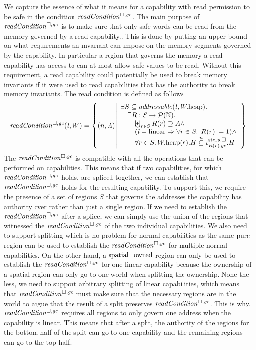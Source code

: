 \begin{jversion}
We capture the essence of what it means for a capability with read permission to be safe in the condition $\readCond{}$.
The main purpose of $\readCond{}$ is to make sure that only safe words can be read from the memory governed by a read capability..
This is done by putting an upper bound on what requirements an invariant can impose on the memory segments governed by the capability.
In particular a region that governs the memory a read capability has access to can at most allow safe values to be read.
Without this requirement, a read capability could potentially be used to break memory invariants if it were used to read capabilities that has the authority to break memory invariants.
The read condition is defined as follows
\[
  \readCond{\lin,W} = \left\{ \npair{A} \middle| 
    \begin{array}{l}
      \exists S \subseteq \addressable{\lin, \pwheap} \ldotp \\
      \quad \exists R : S \fun \powerset{\nats} \ldotp\\
      \qquad \biguplus_{r\in S} R(r) \supseteq A \wedge\\
      \qquad (\lin = \linear \Rightarrow \forall r \in S \ldotp |R(r)|  = 1) \wedge\\
      \qquad \forall r \in S \ldotp \pwheap(r).H \nsubeq \stdreg{R(r),\gc}{\pur}.H
    \end{array}
  \right\}
\]
The $\readCond{}$ is compatible with all the operations that can be performed on capabilities.
This means that if two capabilities, for which $\readCond{}$ holds, are spliced together, we can establish that $\readCond{}$ holds for the resulting capability.
To support this, we require the presence of a set of regions $S$ that governs the addresses the capability has authority over rather than just a single region.
If we need to establish the $\readCond{}$ after a splice, we can simply use the union of the regions that witnessed the $\readCond{}$ of the two individual capabilities.
We also need to support splitting which is no problem for normal capabilities as the same $\mathrm{pure}$ region can be used to establish the $\readCond{}$ for multiple normal capabilities.
On the other hand, a $\mathrm{spatial\_owned}$ region can only be used to establish the $\readCond{}$ for one linear capability because the ownership of a spatial region can only go to one world when splitting the ownership.
None the less, we need to support arbitrary splitting of linear capabilities, which means that $\readCond{}$ must make sure that the necessary regions are in the world to argue that the result of a split preserves $\readCond{}$.
This is why, $\readCond{}$ requires all regions to only govern one address when the capability is linear.
This means that after a split, the authority of the regions for the bottom half of the split can go to one capability and the remaining regions can go to the top half.


\end{jversion}
